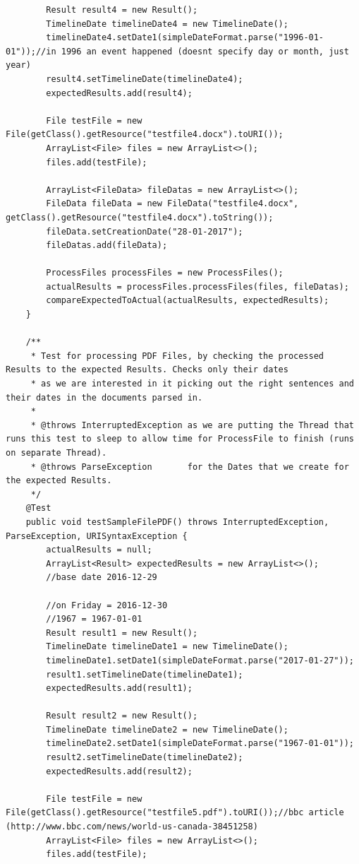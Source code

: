 \begin{lstlisting}
        Result result4 = new Result();
        TimelineDate timelineDate4 = new TimelineDate();
        timelineDate4.setDate1(simpleDateFormat.parse("1996-01-01"));//in 1996 an event happened (doesnt specify day or month, just year)
        result4.setTimelineDate(timelineDate4);
        expectedResults.add(result4);

        File testFile = new File(getClass().getResource("testfile4.docx").toURI());
        ArrayList<File> files = new ArrayList<>();
        files.add(testFile);

        ArrayList<FileData> fileDatas = new ArrayList<>();
        FileData fileData = new FileData("testfile4.docx", getClass().getResource("testfile4.docx").toString());
        fileData.setCreationDate("28-01-2017");
        fileDatas.add(fileData);

        ProcessFiles processFiles = new ProcessFiles();
        actualResults = processFiles.processFiles(files, fileDatas);
        compareExpectedToActual(actualResults, expectedResults);
    }

    /**
     * Test for processing PDF Files, by checking the processed Results to the expected Results. Checks only their dates
     * as we are interested in it picking out the right sentences and their dates in the documents parsed in.
     *
     * @throws InterruptedException as we are putting the Thread that runs this test to sleep to allow time for ProcessFile to finish (runs on separate Thread).
     * @throws ParseException       for the Dates that we create for the expected Results.
     */
    @Test
    public void testSampleFilePDF() throws InterruptedException, ParseException, URISyntaxException {
        actualResults = null;
        ArrayList<Result> expectedResults = new ArrayList<>();
        //base date 2016-12-29

        //on Friday = 2016-12-30
        //1967 = 1967-01-01
        Result result1 = new Result();
        TimelineDate timelineDate1 = new TimelineDate();
        timelineDate1.setDate1(simpleDateFormat.parse("2017-01-27"));
        result1.setTimelineDate(timelineDate1);
        expectedResults.add(result1);

        Result result2 = new Result();
        TimelineDate timelineDate2 = new TimelineDate();
        timelineDate2.setDate1(simpleDateFormat.parse("1967-01-01"));
        result2.setTimelineDate(timelineDate2);
        expectedResults.add(result2);

        File testFile = new File(getClass().getResource("testfile5.pdf").toURI());//bbc article (http://www.bbc.com/news/world-us-canada-38451258)
        ArrayList<File> files = new ArrayList<>();
        files.add(testFile);


\end{lstlisting}
